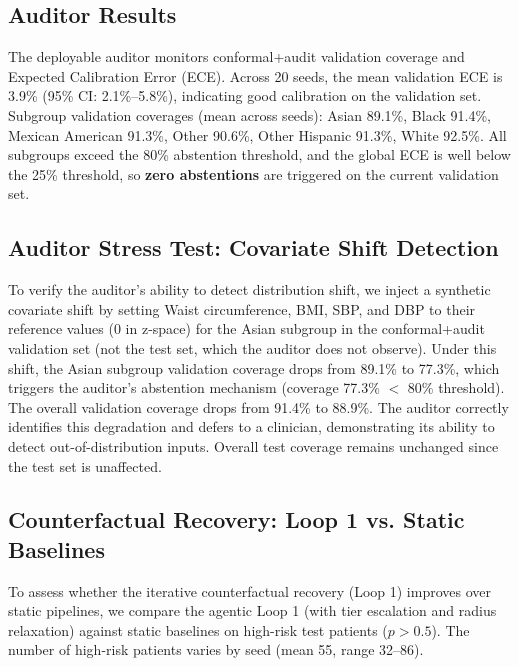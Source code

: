\documentclass[11pt,a4paper]{article}
\theoremstyle{plain}
\begin{document}
\subsection{Auditor Results}

The deployable auditor monitors conformal+audit validation coverage and Expected Calibration Error (ECE). Across 20 seeds, the mean validation ECE is 3.9\% (95\% CI: 2.1\%--5.8\%), indicating good calibration on the validation set. Subgroup validation coverages (mean across seeds): Asian 89.1\%, Black 91.4\%, Mexican American 91.3\%, Other 90.6\%, Other Hispanic 91.3\%, White 92.5\%. All subgroups exceed the 80\% abstention threshold, and the global ECE is well below the 25\% threshold, so \textbf{zero abstentions} are triggered on the current validation set.

\subsection{Auditor Stress Test: Covariate Shift Detection}
\label{sec:auditor_stress}

To verify the auditor's ability to detect distribution shift, we inject a synthetic covariate shift by setting Waist circumference, BMI, SBP, and DBP to their reference values (0 in z-space) for the Asian subgroup in the conformal+audit validation set (not the test set, which the auditor does not observe). Under this shift, the Asian subgroup validation coverage drops from 89.1\% to 77.3\%, which triggers the auditor's abstention mechanism (coverage 77.3\% $<$ 80\% threshold). The overall validation coverage drops from 91.4\% to 88.9\%. The auditor correctly identifies this degradation and defers to a clinician, demonstrating its ability to detect out-of-distribution inputs. Overall test coverage remains unchanged since the test set is unaffected.

\subsection{Counterfactual Recovery: Loop 1 vs. Static Baselines}
\label{sec:counterfactual_baselines}

To assess whether the iterative counterfactual recovery (Loop 1) improves over static pipelines, we compare the agentic Loop 1 (with tier escalation and radius relaxation) against static baselines on high-risk test patients ($p > 0.5$). The number of high-risk patients varies by seed (mean 55, range 32--86).
\end{document}
